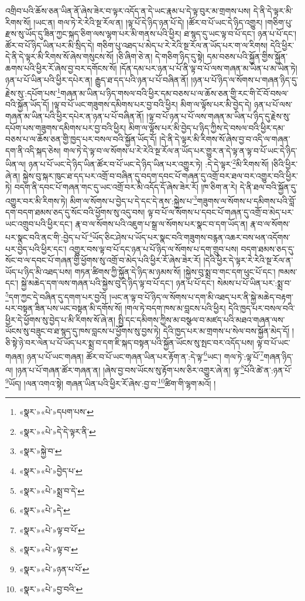 འགྲིབ་པའི་ཆོས་ཅན་ཡིན་ནོ་ཞེས་ཟེར་བ་ལྟར་འདོད་ན་དེ་ཡང་རྣམ་པ་དེ་ལྟ་བུར་མ་གྲགས་པས། དེ་ནི་དེ་ལྟར་མི་རིགས་སོ། །ཡང་ན། གལ་ཏེ་རེ་རེའི་སྔ་རོལ་ན། །ལྟ་པོ་དེ་ཉིད་ཉན་པོ་དེ། །ཚོར་བ་པོ་ཡང་དེ་ཉིད་འགྱུར། །གཅིག་པུ་རྫས་སུ་ཡོད་དུ་ཟིན་ཀྱང་སྐད་ཅིག་ལས་ལྷག་པར་མི་གནས་པའི་ཕྱིར། ཐ་སྙད་དུ་ཡང་ལྟ་བ་པོ་དང་། ཉན་པ་པོ་དང་། ཚོར་བ་པོ་ཉིད་ཡིན་པར་མི་སྲིད་དེ། གཅིག་པུ་འཐད་པ་མེད་པ་རེ་རེའི་སྔ་རོལ་ན་ཡོད་པར་ག་ལ་རིགས། དེའི་ཕྱིར་དེ་ནི་དེ་ལྟར་མི་རིགས་སོ་ཞེས་གསུངས་སོ། །ཅི་ཞིག་ཅེ་ན། དེ་གཅིག་ཉིད་དུ་སྟེ། དམ་བཅས་པའི་སྐྱོན་གྱིས་སྐྱོན་ཆགས་པའི་ཕྱིར་རོ་ཞེས་བྱ་བར་དགོངས་སོ། །དོན་དམ་པར་ཉན་པ་པོ་ནི་ལྟ་བ་པོ་ལས་གཞན་མ་ཡིན་པ་མ་ཡིན་ཏེ། ཉན་པ་པོ་ཡིན་པའི་ཕྱིར་དཔེར་ན། རྒྱུད་ཐ་དད་པའི་ཉན་པ་པོ་བཞིན་ནོ། །ཉན་པ་པོ་ཉིད་ལ་སོགས་པ་གཞན་ཉིད་དུ་རྗེས་སུ་:དཔོག་པས་\footnote{«སྣར་»«པེ་»དཔག་པས་}གཞན་མ་ཡིན་པ་ཉིད་གསལ་བའི་ཕྱིར་དམ་བཅས་པ་ལ་ཆོས་ཅན་གྱི་རང་གི་ངོ་བོ་བསལ་བའི་སྐྱོན་ཡོད་དོ། །ལྟ་བ་པོ་ཡང་གཟུགས་དམིགས་པར་བྱ་བའི་ཕྱིར། མིག་ལ་ལྟོས་པར་མི་བྱེད་དེ། ཉན་པ་པོ་ལས་གཞན་མ་ཡིན་པའི་ཕྱིར་དཔེར་ན་ཉན་པ་པོ་བཞིན་ནོ། །ལྟ་བ་པོ་ཉན་པ་པོ་ལས་གཞན་མ་ཡིན་པ་ཉིད་དུ་རྗེས་སུ་དཔོག་པས་གཟུགས་དམིགས་པར་བྱ་བའི་ཕྱིར། མིག་ལ་ལྟོས་པར་མི་བྱེད་པ་ཉིད་ཀྱིས་དེ་བསལ་བའི་ཕྱིར་དམ་བཅས་པ་ལ་ཆོས་ཅན་གྱི་ཁྱད་པར་བསལ་བའི་སྐྱོན་ཡོད་དོ། །དེ་ནི་དེ་ལྟར་མི་རིགས་སོ་ཞེས་བྱ་བ་འདི་ལ་གཞན་དག་ནི་འདི་སྐད་ཅེས། གལ་ཏེ་དེ་ལྟ་བ་ལ་སོགས་པ་རེ་རེའི་སྔ་རོལ་ན་ཡོད་པར་གྱུར་ན་དེ་ལྟ་ན་ལྟ་བ་པོ་ཡང་དེ་ཉིད་ཡིན་ལ། ཉན་པ་པོ་ཡང་དེ་ཉིད་ཡིན་ཚོར་བ་པོ་ཡང་དེ་ཉིད་ཡིན་པར་འགྱུར་ཏེ། :དེ་དེ་ལྟར་\footnote{«སྣར་»«པེ་»དེ་དེ་ལྟར་ནི་}མི་རིགས་སོ། །ཅིའི་ཕྱིར་ཞེ་ན། སྐྱེས་བུ་སྐར་ཁུང་ཐ་དད་པར་འགྲོ་བ་བཞིན་དུ་བདག་དབང་པོ་གཞན་དུ་འགྲོ་བར་ཐལ་བར་འགྱུར་བའི་ཕྱིར་ཏེ། བདག་ནི་དབང་པོ་གཞན་གང་དུ་ཡང་འགྲོ་བར་མི་འདོད་དོ་ཞེས་ཟེར་རོ། །ཁ་ཅིག་ན་རེ། དེ་ནི་ཐལ་བའི་སྐྱོན་དུ་འགྱུར་བར་མི་རིགས་ཏེ། མིག་ལ་སོགས་པ་བྱེད་པ་དེ་དང་དེ་ནས་:སྐྱེས་པ་\footnote{«སྣར་»སྐྱེ་བ་}གཟུགས་ལ་སོགས་པ་དམིགས་པའི་བློ་དག་བདག་ཐམས་ཅད་དུ་སོང་བའི་ཕྱོགས་སུ་འདུ་བས། ལྟ་བ་པོ་ལ་སོགས་པ་དབང་པོ་གཞན་དུ་འགྲོ་བ་མེད་པར་ཡང་འགྲུབ་པའི་ཕྱིར་དང་། རྣ་བ་ལ་སོགས་པའི་འཇུག་པ་སྒྲ་ལ་སོགས་པར་སྣང་བ་དག་ཡོད་ན། རྣ་བ་ལ་སོགས་པར་སྣང་བའི་ནང་གི་:བྱེད་པ་པོ་\footnote{«སྣར་»«པེ་»བྱེད་པ་}ཡོད་ཅིང་ཤེས་པ་ཡོད་པར་སྣང་བའི་གཟུགས་བརྙན་འཆར་བས་ཕན་འདོགས་པར་བྱེད་པའི་ཕྱིར་དང་། འགྱུར་བས་ལྟ་བ་པོ་དང་ཉན་པ་པོ་ཉིད་ལ་སོགས་པ་དག་གྲུབ་པས། བདག་ཐམས་ཅད་དུ་སོང་བ་ལ་དབང་པོ་གཞན་གྱི་ཕྱོགས་སུ་འགྲོ་བ་མེད་པའི་ཕྱིར་རོ་ཞེས་ཟེར་རོ། །དེའི་ཕྱིར་དེ་ལྟར་རེ་རེའི་སྔ་རོལ་ན་ཡོད་པ་ཉིད་མི་འཐད་པས། གཏན་ཚིགས་ཀྱི་སྐྱོན་དེ་ཉིད་མ་ཉམས་སོ། །སྐྱེས་བུ་སྨྲ་བ་གང་དག་ཕུང་པོ་དང་། ཁམས་དང་། སྐྱེ་མཆེད་དག་ལས་གཞན་པའི་སྐྱེས་བུ་དེ་ཉིད་ལྟ་བ་པོ་དང་། ཉན་པ་པོ་དང་། སེམས་པ་པོ་ཡིན་པར་:སྨྲ་བ་\footnote{«སྣར་»«པེ་»སྨྲ་བ་དེ་}དག་ཀྱང་དེ་བཞིན་དུ་དགག་པར་བྱའོ། །ཡང་ན་ལྟ་བ་པོ་ཉིད་ལ་སོགས་པ་དག་མི་འཐད་པར་ནི་སྐྱེ་མཆེད་བརྟག་པར་བསྟན་ཟིན་པས་ཡང་བསྟན་མི་དགོས་སོ། །གལ་ཏེ་བདག་ཁས་མ་བླངས་པའི་ཕྱིར། དེའི་ཁྱད་པར་བསལ་བའི་ཕྱིར་དེ་ཕྱོགས་སུ་བྱེད་པ་མི་རིགས་སོ་ཞེ་ན། སྤྱི་དང་དམིགས་ཀྱིས་མ་བསྩལ་བ་མཛད་པའི་མཐའ་གཞན་ལས་ཡོངས་སུ་བཟུང་བ་ཐ་སྙད་དུ་ཁས་བླངས་པ་ཕྱོགས་སུ་བྱས་ཏེ། དེའི་ཁྱད་པར་མ་གྲགས་པ་སེལ་བས་སྐྱོན་མེད་དོ། །ཅི་སྟེ་ཉེ་བར་ལེན་པ་པོ་ཡོད་པར་སྨྲ་བ་དག་ཇི་སྐད་བསྟན་པའི་སྐྱོན་ཡོངས་སུ་སྤང་བར་འདོད་པས། ལྟ་བ་པོ་ཡང་གཞན། ཉན་པ་པོ་ཡང་གཞན། ཚོར་བ་པོ་ཡང་གཞན་ཡིན་པར་རྟོག་ན་:དེ་ལྟ་\footnote{«སྣར་»«པེ་»དེ་}ཡང་། གལ་ཏེ་:ལྟ་པོ་\footnote{«སྣར་»«པེ་»ལྟ་བ་པོ་}གཞན་ཉིད་ལ། །ཉན་པ་པོ་གཞན་ཚོར་གཞན་ན། །ཞེས་བྱ་བས་ཡོངས་སུ་རྟོག་པས་ཅིར་འགྱུར་ཞེ་ན། ལྟ་\footnote{«སྣར་»«པེ་»ལྟ་བ་}པོའི་ཚེ་ན་:ཉན་པོ་\footnote{«སྣར་»«པེ་»ཉན་པ་པོ་}ཡོད། །ལན་འགའ་སྟེ། གཞན་ཡིན་པའི་ཕྱིར་རོ་ཞེས་:བྱ་བ་\footnote{«སྣར་»«པེ་»བྱ་བའི་}ཚིག་གི་ལྷག་མའོ། །
